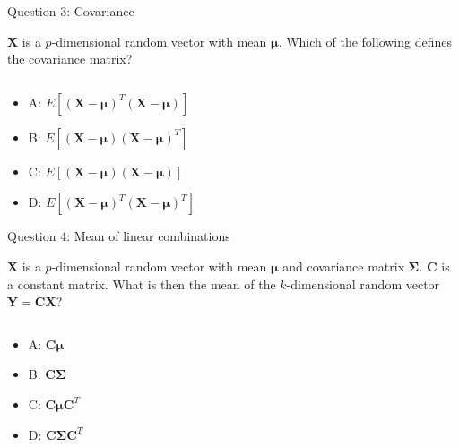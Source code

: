 \documentclass[ignorenonframetext,]{beamer}
\providecommand{\tightlist}{%
  \setlength{\itemsep}{0pt}\setlength{\parskip}{0pt}}
\begin{document}
\begin{frame}

\begin{block}{Question 3: Covariance}

\vspace{2mm}

\(\boldsymbol{X}\) is a \(p\)-dimensional random vector with mean
\(\boldsymbol{\mu}\). Which of the following defines the covariance
matrix?

\(~\)

\begin{itemize}
\tightlist
\item
  A:
  \(E[(\boldsymbol{X}-\boldsymbol{\mu})^T(\boldsymbol{X}-\boldsymbol{\mu})]\)
\item
  B:
  \(E[(\boldsymbol{X}-\boldsymbol{\mu})(\boldsymbol{X}-\boldsymbol{\mu})^T]\)
\item
  C:
  \(E[(\boldsymbol{X}-\boldsymbol{\mu})(\boldsymbol{X}-\boldsymbol{\mu})]\)\\
\item
  D:
  \(E[(\boldsymbol{X}-\boldsymbol{\mu})^T(\boldsymbol{X}-\boldsymbol{\mu})^T]\)
\end{itemize}

\end{block}

\end{frame}

\begin{frame}

\begin{block}{Question 4: Mean of linear combinations}

\vspace{2mm}

\(\boldsymbol{X}\) is a \(p\)-dimensional random vector with mean
\(\boldsymbol{\mu}\) and covariance matrix \(\boldsymbol\Sigma\).
\(\boldsymbol{C}\) is a constant matrix. What is then the mean of the
\(k\)-dimensional random vector
\(\boldsymbol{Y}=\boldsymbol{C}\boldsymbol{X}\)?

\(~\)

\begin{itemize}
\tightlist
\item
  A: \(\boldsymbol{C}\boldsymbol{\mu}\)
\item
  B: \(\boldsymbol{C}\boldsymbol\Sigma\)
\item
  C: \(\boldsymbol{C}\boldsymbol{\mu}\boldsymbol{C}^T\)
\item
  D: \(\boldsymbol{C}\boldsymbol\Sigma\boldsymbol{C}^T\)
\end{itemize}

\end{block}

\end{frame}
\end{document}
